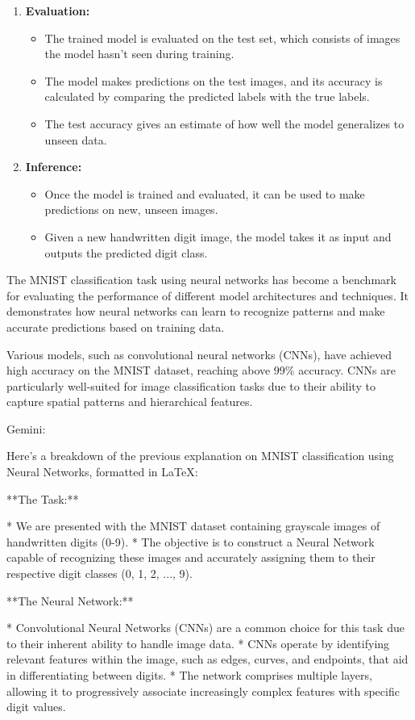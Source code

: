 \begin{enumerate}
  \item \textbf{Evaluation:}
  \begin{itemize}
    \item The trained model is evaluated on the test set, which consists of images the model hasn't seen during training.
    \item The model makes predictions on the test images, and its accuracy is calculated by comparing the predicted labels with the true labels.
    \item The test accuracy gives an estimate of how well the model generalizes to unseen data.
  \end{itemize}

  \item \textbf{Inference:}
  \begin{itemize}
    \item Once the model is trained and evaluated, it can be used to make predictions on new, unseen images.
    \item Given a new handwritten digit image, the model takes it as input and outputs the predicted digit class.
  \end{itemize}
\end{enumerate}

The MNIST classification task using neural networks has become a benchmark for evaluating the performance of different model architectures and techniques. It demonstrates how neural networks can learn to recognize patterns and make accurate predictions based on training data.

Various models, such as convolutional neural networks (CNNs), have achieved high accuracy on the MNIST dataset, reaching above 99\% accuracy. CNNs are particularly well-suited for image classification tasks due to their ability to capture spatial patterns and hierarchical features.


Gemini:

Here's a breakdown of the previous explanation on MNIST classification using Neural Networks, formatted in LaTeX:

**The Task:**

* We are presented with the MNIST dataset containing grayscale images of handwritten digits (0-9).
* The objective is to construct a Neural Network capable of recognizing these images and accurately assigning them to their respective digit classes (0, 1, 2, ..., 9).

**The Neural Network:**

* Convolutional Neural Networks (CNNs) are a common choice for this task due to their inherent ability to handle image data. 
* CNNs operate by identifying relevant features within the image, such as edges, curves, and endpoints, that aid in differentiating between digits.
* The network comprises multiple layers, allowing it to progressively associate increasingly complex features with specific digit values. 

